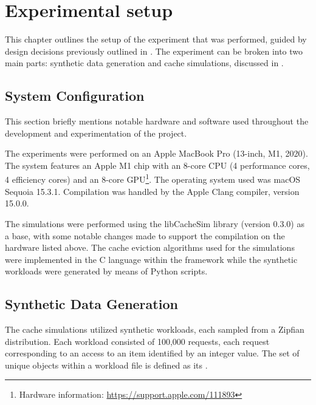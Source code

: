 \chapter{Experimental setup}\label{chapter:experimental-setup}

This chapter outlines the setup of the experiment that was performed, guided by design decisions previously outlined in . The experiment can be broken into two main parts: synthetic data generation and cache simulations, discussed in .


\section{System Configuration}

This section briefly mentions notable hardware and software used throughout the development and experimentation of the project.

\begin{description}[style=unboxed, leftmargin=0cm]
    \item[Hardware] The experiments were performed on an Apple MacBook Pro (13-inch, M1, 2020). The system features an Apple M1 chip with an 8-core CPU (4 performance cores, 4 efficiency cores) and an 8-core GPU\footnote{Hardware information: \url{https://support.apple.com/111893}}. The operating system used was macOS Sequoia 15.3.1. Compilation was handled by the Apple Clang compiler, version 15.0.0.
    \item[Software] The simulations were performed using the libCacheSim library (version 0.3.0) as a base, with some notable changes made to support the compilation on the hardware listed above. The cache eviction algorithms used for the simulations were implemented in the C language within the framework while the synthetic workloads were generated by means of Python scripts.
\end{description}


\section{Synthetic Data Generation}\label{subsec: synthetic-data-generation}

The cache simulations utilized synthetic workloads, each sampled from a Zipfian distribution. Each workload consisted of 100,000 requests, each request corresponding to an access to an item identified by an integer value. The set of unique objects within a workload file is defined as its . 

